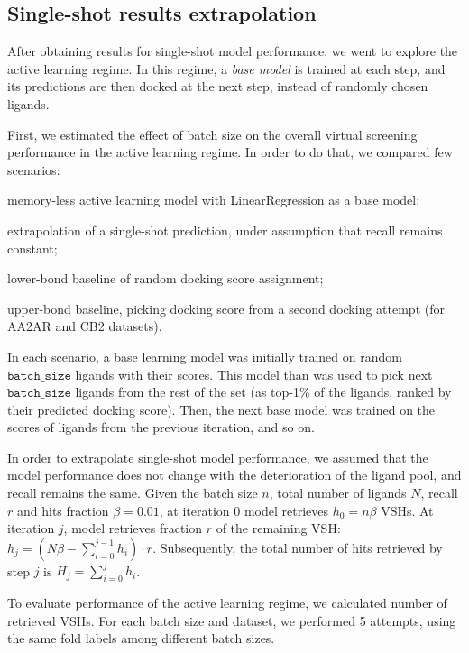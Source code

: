 \subsection{Single-shot results extrapolation}

After obtaining results for single-shot model performance, we went to explore the active learning regime. In this regime, a \textit{base model} is trained at each step, and its predictions are then docked at the next step, instead of randomly chosen ligands. 

First, we estimated the effect of batch size on the overall virtual screening performance in the active learning regime. In order to do that, we compared few scenarios: 
\begin{enumerate*}[label=(\roman*)]
    \item memory-less active learning model with LinearRegression as a base model;
    \item extrapolation of a single-shot prediction, under assumption that recall remains constant;
    \item lower-bond baseline of random docking score assignment;
    \item upper-bond baseline, picking docking score from a second docking attempt (for AA2AR and CB2 datasets).
\end{enumerate*}

In each scenario, a base learning model was initially trained on random $\texttt{batch\_size}$ ligands with their scores. This model than was used to pick next $\texttt{batch\_size}$ ligands from the rest of the set (as top-1\% of the ligands, ranked by their predicted docking score). Then, the next base model was trained on the scores of ligands from the previous iteration, and so on.

In order to extrapolate single-shot model performance, we assumed that the model performance does not change with the deterioration of the ligand pool, and recall remains the same. Given the batch size $n$, total number of ligands $N$, recall $r$ and hits fraction $\beta=0.01$, at iteration 0 model retrieves $h_0 = n\beta$ VSHs. At iteration $j$, model retrieves fraction $r$ of the remaining VSH: $h_j = ( N\beta - \sum_{i=0}^{j-1}h_i ) \cdot r$. Subsequently, the total number of hits retrieved by step $j$ is $H_j = \sum_{i=0}^{j} h_i$.

To evaluate performance of the active learning regime, we calculated number of retrieved VSHs. For each batch size and dataset, we performed 5 attempts, using the same fold labels among different batch sizes.

